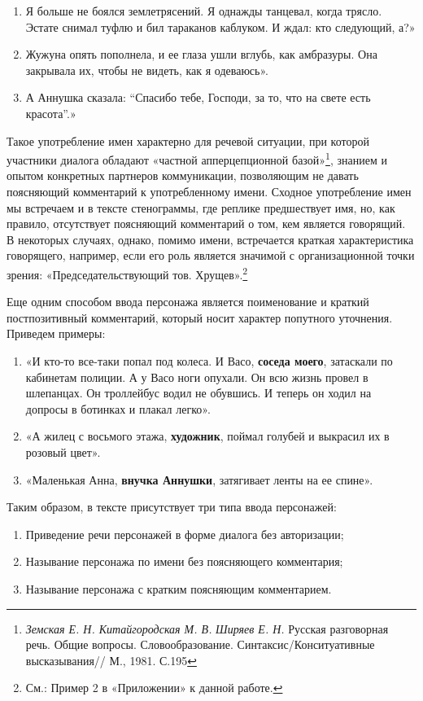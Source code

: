 \documentclass{kursa4}
\begin{document}
        \begin{enumerate}
          \item Я больше не боялся землетрясений. Я однажды танцевал, когда трясло. Эстате снимал туфлю и бил тараканов каблуком. И ждал: кто следующий, а?» \item Жужуна опять пополнела, и ее глаза ушли вглубь, как амбразуры. Она закрывала их, чтобы не видеть, как я одеваюсь». 
          \item А Аннушка сказала: “Спасибо тебе, Господи, за то, что на свете есть красота”.» \end{enumerate}

        Такое употребление имен характерно для речевой ситуации, при которой участники диалога обладают «частной апперцепционной базой»\footnote{\textit{Земская Е. Н. Китайгородская М. В. }\textit{Ширяев Е. Н. }Русская разговорная речь. Общие вопросы. Словообразование. Синтаксис/Конситуативные высказывания// М., 1981. С.195}, знанием и опытом конкретных партнеров коммуникации, позволяющим не давать поясняющий комментарий к употребленному имени. Сходное употребление имен мы встречаем и в тексте стенограммы, где реплике предшествует имя, но, как правило, отсутствует поясняющий комментарий о том, кем является говорящий. В некоторых случаях, однако, помимо имени, встречается краткая характеристика говорящего, например, если его роль является значимой с организационной точки зрения: «Председательствующий тов. Хрущев».\footnote{См.: Пример 2 в «Приложении» к данной работе.} 

        Еще одним способом ввода персонажа является поименование и краткий постпозитивный комментарий, который носит характер попутного уточнения. Приведем примеры: \begin{enumerate}
          \item «И кто-то все-таки попал под колеса. И Васо, \textbf{соседа моего}, затаскали по кабинетам полиции. А у Васо ноги опухали. Он всю жизнь провел в шлепанцах. Он троллейбус водил не обувшись. И теперь он ходил на допросы в ботинках и плакал легко». \item «А жилец с восьмого этажа, \textbf{художник}, поймал голубей и выкрасил их в розовый цвет». \item «Маленькая Анна, \textbf{внучка Аннушки}, затягивает ленты на ее спине». \end{enumerate}

        Таким образом, в тексте присутствует три типа ввода персонажей: 

        \begin{enumerate}
          \item Приведение речи персонажей в форме диалога без авторизации; \item Называние персонажа по имени без поясняющего комментария; \item Называние персонажа с кратким поясняющим комментарием. \end{enumerate}
\end{document}
